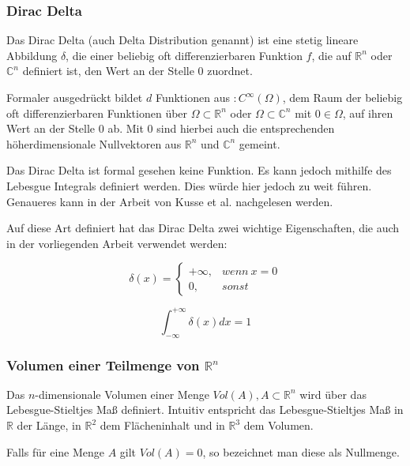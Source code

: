 \documentclass[a4paper,fontsize=12pt,toc=bib,halfparskip,ngerman]{scrartcl}
\begin{document}
\subsubsection{Dirac Delta}
Das Dirac Delta (auch Delta Distribution genannt) ist eine stetig lineare Abbildung $\delta$, die einer beliebig oft differenzierbaren Funktion $f$, die auf $\mathbb{R}^n$ oder $\mathbb{C}^n$ definiert ist, den Wert an der Stelle 0 zuordnet.

Formaler ausgedr\"uckt bildet $d$ Funktionen aus $:C^{\infty}(\Omega)$, dem Raum der beliebig oft differenzierbaren Funktionen \"uber $\Omega \subset \mathbb{R}^n$ oder $\Omega \subset \mathbb{C}^n$ mit $0 \in \Omega$, auf ihren Wert an der Stelle 0 ab. Mit 0 sind hierbei auch die entsprechenden h\"oherdimensionale Nullvektoren aus $\mathbb{R}^n$ und $\mathbb{C}^n$ gemeint.

Das Dirac Delta ist formal gesehen keine Funktion. Es kann jedoch mithilfe des Lebesgue Integrals definiert werden. Dies w\"urde hier jedoch zu weit f\"uhren. Genaueres kann in der Arbeit von Kusse et al. \cite[S.~100~ff.]{kusse2010mathematical} nachgelesen werden.

Auf diese Art definiert hat das Dirac Delta zwei wichtige Eigenschaften, die auch in der vorliegenden Arbeit verwendet werden:

\begin{equation}
	\delta(x)=
	\left\{
	\begin{array}{ll}
		+\infty, & wenn~x = 0\\
		0, & sonst
	\end{array}
	\right.
\end{equation}

\begin{equation}
	\int_{-\infty}^{+\infty}\delta(x)dx = 1
\end{equation}

\subsubsection{Volumen einer Teilmenge von \texorpdfstring{$\mathbb{R}^n$}{}}
Das $n$-dimensionale Volumen einer Menge $Vol(A), A \subset \mathbb{R}^n$ wird \"uber das Lebesgue-Stieltjes Ma{\ss} definiert\cite{kusolitsch2014mass}. Intuitiv entspricht das Lebesgue-Stieltjes Ma{\ss} in $\mathbb{R}$ der L\"ange, in $\mathbb{R}^2$ dem Fl\"acheninhalt und in $\mathbb{R}^3$ dem Volumen.

Falls f\"ur eine Menge $A$ gilt $Vol(A)=0$, so bezeichnet man diese als Nullmenge.
\end{document}
